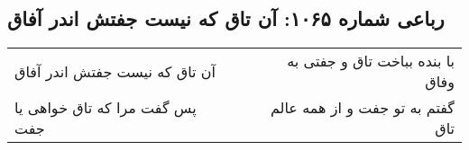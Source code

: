 \begin{center}
\section*{رباعی شماره ۱۰۶۵: آن تاق که نیست جفتش اندر آفاق}
\label{sec:1065}
\begin{longtable}{l p{0.5cm} r}
آن تاق که نیست جفتش اندر آفاق
&&
با بنده بباخت تاق و جفتی به وفاق
\\
پس گفت مرا که تاق خواهی یا جفت
&&
گفتم به تو جفت و از همه عالم تاق
\\
\end{longtable}
\end{center}
